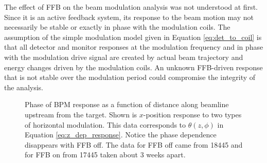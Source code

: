 The effect of FFB on the beam modulation analysis was not understood at first. Since it is an active feedback system, its response to the beam motion may not necessarily be stable or exactly in phase with the modulation coils. The assumption of the simple modulation model given in Equation \ref{eq:det_to_coil} is that all detector and monitor responses at the modulation frequency and in phase with the modulation drive signal are created by actual beam trajectory and energy changes driven by the modulation coils.  An unknown FFB-driven response that is not stable over the modulation period could compromise the integrity of the analysis.
\begin{figure}[ht]
\begin{center}
\end{center}
\caption{Phase of BPM response as a function of distance along beamline upstream from the target. Shown is $x$-position response to two types of horizontal modulation. This data corresponds to $\theta (z,\phi)$ in Equation \ref{eq:z_dep_response}.  Notice the phase dependence disappears with FFB off. The data for FFB off came from 18445 and for FFB on from 17445 taken about 3 weeks apart.}
\label{fig:bpm_phase_vs_z_xmod}
\end{figure}
